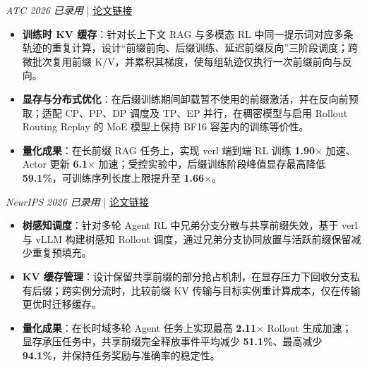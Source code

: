 \documentclass{resume}
\begin{document}
\textit{ATC 2026 已录用} \quad | \quad \href{https://arxiv.org/html/2606.01143v4}{论文链接}
\begin{itemize}[parsep=0.3ex]
  \item \textbf{训练时 KV 缓存}：针对长上下文 RAG 与多模态 RL 中同一提示词对应多条轨迹的重复计算，设计“前缀前向、后缀训练、延迟前缀反向”三阶段调度；跨微批次复用前缀 K/V，并累积其梯度，使每组轨迹仅执行一次前缀前向与反向。
  \item \textbf{显存与分布式优化}：在后缀训练期间卸载暂不使用的前缀激活，并在反向前预取；适配 CP、PP、DP 调度及 TP、EP 并行，在稠密模型与启用 Rollout Routing Replay 的 MoE 模型上保持 BF16 容差内的训练等价性。
  \item \textbf{量化成果}：在长前缀 RAG 任务上，实现 verl 端到端 RL 训练 \textbf{1.90$\times$} 加速、Actor 更新 \textbf{6.1$\times$} 加速；受控实验中，后缀训练阶段峰值显存最高降低 \textbf{59.1\%}，可训练序列长度上限提升至 \textbf{1.66$\times$}。
\end{itemize}

\vspace{0.1cm}

\textit{NeurIPS 2026 已录用} \quad | \quad \href{https://openreview.net/forum?id=FPJ4b4JwEE}{论文链接}
\begin{itemize}[parsep=0.3ex]
  \item \textbf{树感知调度}：针对多轮 Agent RL 中兄弟分支分散与共享前缀失效，基于 verl 与 vLLM 构建树感知 Rollout 调度，通过兄弟分支协同放置与活跃前缀保留减少重复预填充。
  \item \textbf{KV 缓存管理}：设计保留共享前缀的部分抢占机制，在显存压力下回收分支私有后缀；跨实例分流时，比较前缀 KV 传输与目标实例重计算成本，仅在传输更优时迁移缓存。
  \item \textbf{量化成果}：在长时域多轮 Agent 任务上实现最高 \textbf{2.11$\times$} Rollout 生成加速；显存承压任务中，共享前缀完全释放事件平均减少 \textbf{51.1\%}、最高减少 \textbf{94.1\%}，并保持任务奖励与准确率的稳定性。
\end{itemize}

\vspace{0.1cm}
\end{document}
